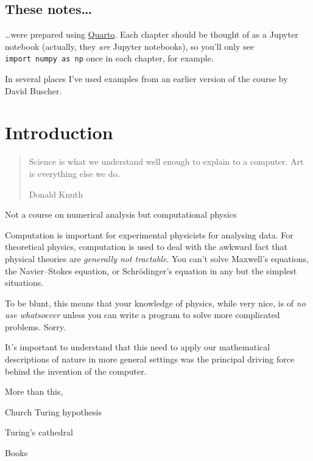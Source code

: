 \documentclass[
  letterpaper,
  DIV=11,
  numbers=noendperiod]{scrreprt}
\theoremstyle{definition}
\theoremstyle{remark}
\begin{document}
\hypertarget{these-notes}{%
\section*{These notes\ldots{}}\label{these-notes}}


\ldots were prepared using \href{https://quarto.org/}{Quarto}. Each
chapter should be thought of as a Jupyter notebook (actually, they
\emph{are} Jupyter notebooks), so you'll only see
\texttt{import\ numpy\ as\ np} once in each chapter, for example.

In several places I've used examples from an earlier version of the
course by David Buscher.


\hypertarget{introduction}{%
\chapter{Introduction}\label{introduction}}

\begin{quote}
Science is what we understand well enough to explain to a computer. Art
is everything else we do.

Donald Knuth
\end{quote}

Not a course on numerical analysis but computational physics

Computation is important for experimental physicists for analysing data.
For theoretical physics, computation is used to deal with the awkward
fact that physical theories are \emph{generally not tractable}. You
can't solve Maxwell's equations, the Navier--Stokes equation, or
Schrödinger's equation in any but the simplest situations.

To be blunt, this means that your knowledge of physics, while very nice,
is of \emph{no use whatsoever} unless you can write a program to solve
more complicated problems. Sorry.

It's important to understand that this need to apply our mathematical
descriptions of nature in more general settings was the principal
driving force behind the invention of the computer.

More than this,

Church Turing hypothesis

Turing's cathedral

Books
\end{document}
